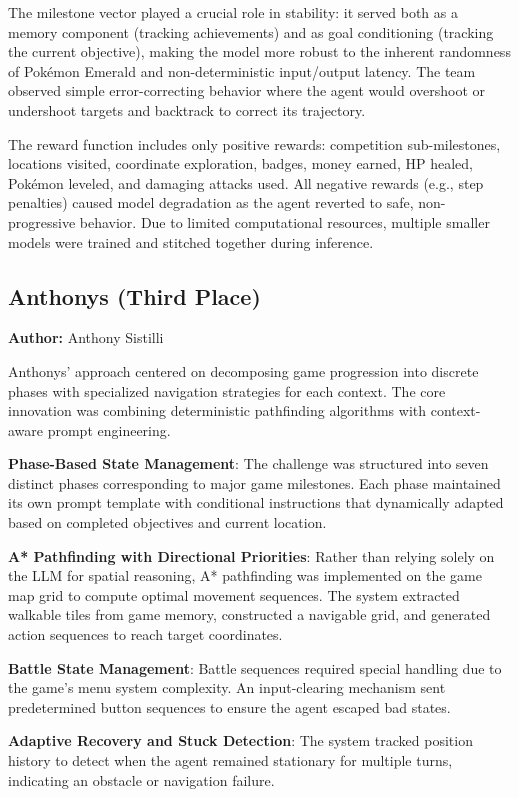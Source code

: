 The milestone vector played a crucial role in stability: it served both as a memory component (tracking achievements) and as goal conditioning (tracking the current objective), making the model more robust to the inherent randomness of Pok\'{e}mon Emerald and non-deterministic input/output latency. The team observed simple error-correcting behavior where the agent would overshoot or undershoot targets and backtrack to correct its trajectory.

The reward function includes only positive rewards: competition sub-milestones, locations visited, coordinate exploration, badges, money earned, HP healed, Pok\'{e}mon leveled, and damaging attacks used. All negative rewards (e.g., step penalties) caused model degradation as the agent reverted to safe, non-progressive behavior. Due to limited computational resources, multiple smaller models were trained and stitched together during inference.

\subsection{Anthonys (Third Place)}\label{sec:anthonys}

\textbf{Author:} Anthony Sistilli

Anthonys' approach centered on decomposing game progression into discrete phases with specialized navigation strategies for each context. The core innovation was combining deterministic pathfinding algorithms with context-aware prompt engineering.

\textbf{Phase-Based State Management}: The challenge was structured into seven distinct phases corresponding to major game milestones. Each phase maintained its own prompt template with conditional instructions that dynamically adapted based on completed objectives and current location.

\textbf{A* Pathfinding with Directional Priorities}: Rather than relying solely on the LLM for spatial reasoning, A* pathfinding was implemented on the game map grid to compute optimal movement sequences. The system extracted walkable tiles from game memory, constructed a navigable grid, and generated action sequences to reach target coordinates.

\textbf{Battle State Management}: Battle sequences required special handling due to the game's menu system complexity. An input-clearing mechanism sent predetermined button sequences to ensure the agent escaped bad states.

\textbf{Adaptive Recovery and Stuck Detection}: The system tracked position history to detect when the agent remained stationary for multiple turns, indicating an obstacle or navigation failure.


